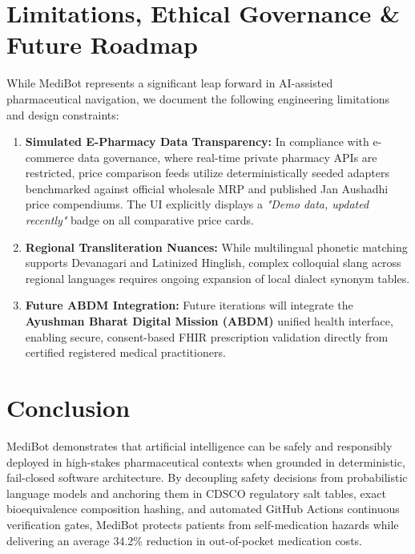 \documentclass[11pt,a4paper]{article}
\begin{document}
\section{Limitations, Ethical Governance \& Future Roadmap}

While MediBot represents a significant leap forward in AI-assisted pharmaceutical navigation, we document the following engineering limitations and design constraints:
\begin{enumerate}[leftmargin=*]
  \item \textbf{Simulated E-Pharmacy Data Transparency:} In compliance with e-commerce data governance, where real-time private pharmacy APIs are restricted, price comparison feeds utilize deterministically seeded adapters benchmarked against official wholesale MRP and published Jan Aushadhi price compendiums. The UI explicitly displays a \textit{"Demo data, updated recently"} badge on all comparative price cards.
  \item \textbf{Regional Transliteration Nuances:} While multilingual phonetic matching supports Devanagari and Latinized Hinglish, complex colloquial slang across regional languages requires ongoing expansion of local dialect synonym tables.
  \item \textbf{Future ABDM Integration:} Future iterations will integrate the \textbf{Ayushman Bharat Digital Mission (ABDM)} unified health interface, enabling secure, consent-based FHIR prescription validation directly from certified registered medical practitioners.
\end{enumerate}

\section{Conclusion}

MediBot demonstrates that artificial intelligence can be safely and responsibly deployed in high-stakes pharmaceutical contexts when grounded in deterministic, fail-closed software architecture. By decoupling safety decisions from probabilistic language models and anchoring them in CDSCO regulatory salt tables, exact bioequivalence composition hashing, and automated GitHub Actions continuous verification gates, MediBot protects patients from self-medication hazards while delivering an average 34.2\% reduction in out-of-pocket medication costs.



\end{document}
